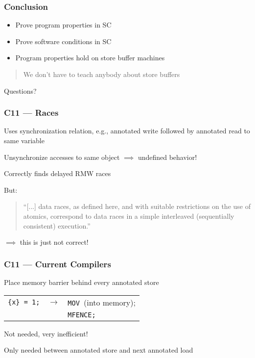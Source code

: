 \documentclass{beamer}
\begin{document}
\begin{frame}
\frametitle{Conclusion}
\begin{itemize} 
	\item Prove program properties in SC
	\item Prove software conditions in SC
	\item Program properties hold on store buffer machines
\end{itemize} 

\begin{quotation} 
	We don't have to teach anybody about store buffers
\end{quotation}
\end{frame} 



\begin{frame} 
\begin{center} 
	Questions?
\end{center}
\end{frame}

\begin{frame} 
\frametitle{C11 --- Races} 
Uses synchronization relation, e.g., annotated write followed by annotated read to same variable 
\begin{center}
	{}
\end{center}
Unsynchronize accesses to same object $\implies$ undefined behavior!

Correctly finds delayed RMW races

But: 
\begin{quotation}
	``[...] data races, as defined here, and with suitable restrictions on the use of atomics, correspond to data races in a simple interleaved (sequentially consistent) execution.''
\end{quotation}
$\implies$ this is just not correct!
\end{frame}

\begin{frame} 
\frametitle{C11 --- Current Compilers} 
Place memory barrier behind every annotated store

\begin{center}
\begin{tabular}{lcl}
\texttt{\{x\} = 1;} & $\to$ & \texttt{MOV }(into memory); \\
 & & \texttt{MFENCE;}
\end{tabular}
\end{center}

Not needed, very inefficient!

Only needed between annotated store and next annotated load
\end{frame} 
\end{document}
